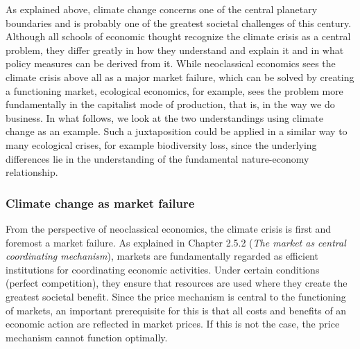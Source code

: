 \documentclass[
  british,
  a4paper,
  DIV=11,
  numbers=noendperiod,
  oneside,
  openany]{scrreprt}
\begin{document}
As explained above, climate change concerns one of the central planetary
boundaries and is probably one of the greatest societal challenges of
this century. Although all schools of economic thought recognize the
climate crisis as a central problem, they differ greatly in how they
understand and explain it and in what policy measures can be derived
from it. While neoclassical economics sees the climate crisis above all
as a major market failure, which can be solved by creating a functioning
market, ecological economics, for example, sees the problem more
fundamentally in the capitalist mode of production, that is, in the way
we do business. In what follows, we look at the two understandings using
climate change as an example. Such a juxtaposition could be applied in a
similar way to many ecological crises, for example biodiversity loss,
since the underlying differences lie in the understanding of the
fundamental nature-economy relationship.

\subsubsection{Climate change as market
failure}\label{climate-change-as-market-failure}

From the perspective of neoclassical economics, the climate crisis is
first and foremost a market failure. As explained in Chapter 2.5.2
(\emph{The market as central coordinating mechanism}), markets are
fundamentally regarded as efficient institutions for coordinating
economic activities. Under certain conditions (perfect competition),
they ensure that resources are used where they create the greatest
societal benefit. Since the price mechanism is central to the
functioning of markets, an important prerequisite for this is that all
costs and benefits of an economic action are reflected in market prices.
If this is not the case, the price mechanism cannot function optimally.
\end{document}
